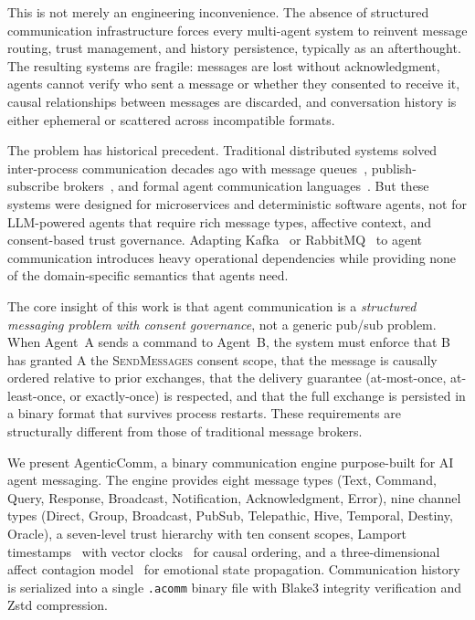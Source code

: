 \documentclass[10pt, twocolumn]{article}
\begin{document}
This is not merely an engineering inconvenience. The absence of structured communication infrastructure forces every multi-agent system to reinvent message routing, trust management, and history persistence, typically as an afterthought. The resulting systems are fragile: messages are lost without acknowledgment, agents cannot verify who sent a message or whether they consented to receive it, causal relationships between messages are discarded, and conversation history is either ephemeral or scattered across incompatible formats.

The problem has historical precedent. Traditional distributed systems solved inter-process communication decades ago with message queues~\cite{kafka2011, rabbitmq2012}, publish-subscribe brokers~\cite{nats2021}, and formal agent communication languages~\cite{fipa2002, kqml1994}. But these systems were designed for microservices and deterministic software agents, not for LLM-powered agents that require rich message types, affective context, and consent-based trust governance. Adapting Kafka~\cite{kafka2011} or RabbitMQ~\cite{rabbitmq2012} to agent communication introduces heavy operational dependencies while providing none of the domain-specific semantics that agents need.

The core insight of this work is that agent communication is a \emph{structured messaging problem with consent governance}, not a generic pub/sub problem. When Agent~A sends a command to Agent~B, the system must enforce that B has granted A the \textsc{SendMessages} consent scope, that the message is causally ordered relative to prior exchanges, that the delivery guarantee (at-most-once, at-least-once, or exactly-once) is respected, and that the full exchange is persisted in a binary format that survives process restarts. These requirements are structurally different from those of traditional message brokers.

We present AgenticComm, a binary communication engine purpose-built for AI agent messaging. The engine provides eight message types (Text, Command, Query, Response, Broadcast, Notification, Acknowledgment, Error), nine channel types (Direct, Group, Broadcast, PubSub, Telepathic, Hive, Temporal, Destiny, Oracle), a seven-level trust hierarchy with ten consent scopes, Lamport timestamps~\cite{lamport1978time} with vector clocks~\cite{mattern1989virtual} for causal ordering, and a three-dimensional affect contagion model~\cite{russell1980circumplex, mehrabian1996pleasure} for emotional state propagation. Communication history is serialized into a single \texttt{.acomm} binary file with Blake3 integrity verification and Zstd compression.
\end{document}
